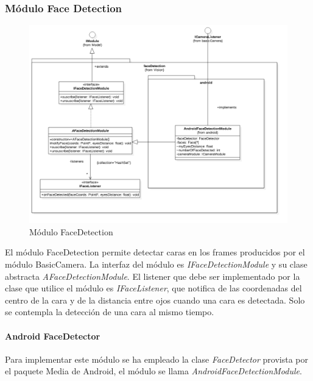 \subsubsection{Módulo Face Detection}
\begin{figure}
	\centering
	\includegraphics[width=1\linewidth]{imagenes/diagramas/FaceDetectionModule.png}
	\caption{Módulo FaceDetection}
	\label{fig:face-detection-module}
\end{figure}
El módulo FaceDetection permite detectar caras en los frames producidos por el módulo BasicCamera. La interfaz del módulo es \textit{IFaceDetectionModule} y su clase abstracta \textit{AFaceDetectionModule}. El listener que debe ser implementado por la clase que utilice el módulo es \textit{IFaceListener}, que notifica de las coordenadas del centro de la cara y de la distancia entre ojos cuando una cara es detectada. Solo se contempla la detección de una cara al mismo tiempo.

\paragraph*{Android FaceDetector\\}
Para implementar este módulo se ha empleado la clase \textit{FaceDetector} provista por el paquete Media de Android, el módulo se llama \textit{AndroidFaceDetectionModule}.
\newpage

